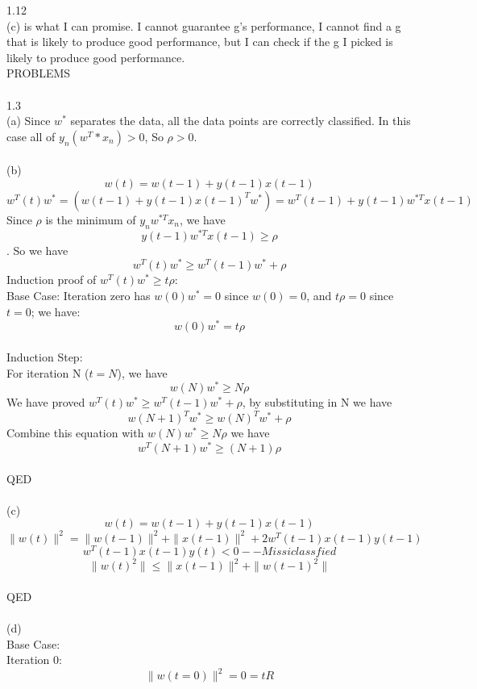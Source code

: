 \documentclass[12pt]{article}
\begin{document}
1.12\\%
(c) is what I can promise. I cannot guarantee g’s performance, I cannot find a g that is likely to produce good performance, but I can check if the g I picked is likely to produce good performance.\\

PROBLEMS\\\\
1.3\\%
(a) Since $w^*$ separates the data, all the data points are correctly classified. In this case all of $y_n(w^T*x_n)>0$, So $\rho>0$.\\\\  
(b)
$$w(t)=w(t-1)+y(t-1)x(t-1)$$
$$w^T(t)w^* = (w(t-1)+y(t-1)x(t-1)^Tw^*)=w^T(t-1)+y(t-1)w^{*T}x(t-1)$$
Since $\rho$ is the minimum of $y_nw^{*T}x_n$, we have $$y(t-1)w^{*T}x(t-1)\geq\rho$$. So we have $$w^T(t)w^*\geq w^T(t-1)w^* +\rho$$
Induction proof of $w^T(t)w^*\geq t\rho$:\\
Base Case: Iteration zero has $w(0)w^* = 0$ since $w(0)=0$, and $t\rho=0$ since $t=0$; we have: $$w(0)w^*=t\rho$$\\
Induction Step:\\
For iteration N ($t=N$), we have $$w(N)w^*\geq N\rho$$
We have proved $w^T(t)w^*\geq w^T(t-1)w^*+\rho$, by substituting in N we have $$w(N+1)^Tw^*\geq w(N)^Tw^*+\rho$$
Combine this equation with $w(N)w^*\geq N\rho$ we have $$w^T(N+1)w^*\geq (N+1)\rho$$\\
QED\\\\
(c)\\
$$w(t)=w(t-1)+y(t-1)x(t-1)$$
$$\parallel w(t)\parallel ^2 = \parallel w(t-1)\parallel ^2+\parallel x(t-1)\parallel ^2+2w^T(t-1)x(t-1)y(t-1)$$
$$w^T(t-1)x(t-1)y(t)<0 -- Missiclassfied$$
$$\parallel w(t)^2\parallel  \leq　\parallel x(t-1)\parallel ^2+\parallel w(t-1)^2\parallel $$\\
QED\\\\
(d)\\
Base Case:\\
Iteration 0:
$$\parallel w(t=0)\parallel ^2=0=tR$$
\end{document}
